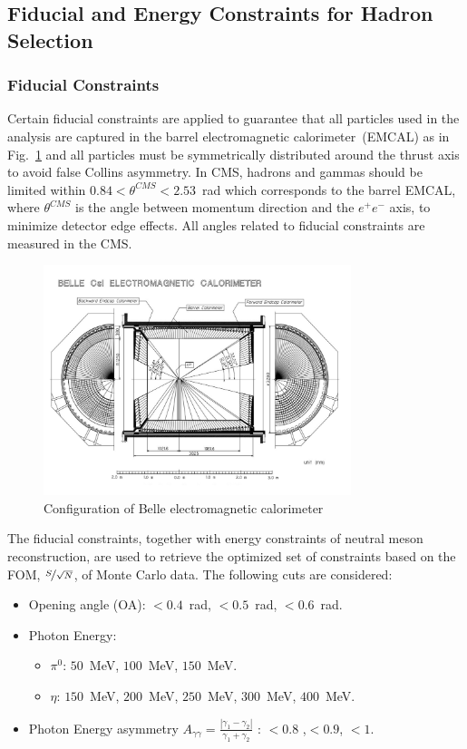 \subsection{Fiducial and Energy Constraints for Hadron Selection}
\subsubsection{Fiducial Constraints}
\label{sec:fiducialcut}
Certain fiducial constraints are applied to guarantee that all particles used in the analysis are captured in the barrel electromagnetic calorimeter~(EMCAL) as in Fig.~\ref{fig:2} and all particles must be symmetrically distributed around the thrust axis to avoid false Collins asymmetry. In CMS, hadrons and gammas should be limited within $0.84<\theta^{CMS}<2.53$~rad which corresponds to the barrel EMCAL, where $\theta^{CMS}$ is the angle between momentum direction and the $e^+e^-$ axis, to minimize detector edge effects. All angles related to fiducial constraints are measured in the CMS.
\begin{figure}[H]
  \centering
  \includegraphics[width=0.8\textwidth,natwidth=610,natheight=642]{figure_dataselection/EMCAL.pdf}
  \caption{Configuration of Belle electromagnetic calorimeter~\cite{BelleDetector}}
  \label{fig:2}
\end{figure}
The fiducial constraints, together with energy constraints of neutral meson reconstruction, are used to retrieve the optimized set of constraints based on the FOM, $\nicefrac{S}{\sqrt{N}}$, of Monte Carlo data. The following cuts are considered:
\begin{itemize}
  \item Opening angle (OA): $<0.4$~rad, $<0.5$~rad, $<0.6$~rad.
  \item Photon Energy:
    \begin{itemize}
      \item $\pi^{0}$: $50$~MeV, $100$~MeV, $150$~MeV. 
      \item $\eta$: $150$~MeV, $200$~MeV, $250$~MeV, $300$~MeV, $400$~MeV. 
    \end{itemize}
  \item Photon Energy asymmetry $A_{\gamma\gamma}=\frac{|\gamma_1-\gamma_2|}{\gamma_1+\gamma_2}$ : $<0.8$ ,$<0.9$, $<1$.
\end{itemize}
